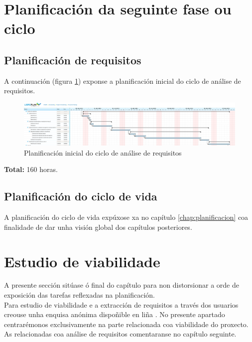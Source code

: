 \section{Planificación da seguinte fase ou ciclo}

 \subsection{Planificación de requisitos}

 A continuación (figura \ref{figura:PlanificacionInicialRequisitos}) exponse a
 planificación inicial do ciclo de análise de requisitos. \\

 \begin{figure}[htbp]
 \centering
 \includegraphics[trim=0 0 48cm 0,clip=true,scale=0.7,keepaspectratio=true]{./imagenes/requisitos.png}
 \caption{Planificación inicial do ciclo de análise de requisitos}
 \label{figura:PlanificacionInicialRequisitos}
\end{figure}

\textbf{Total:} 160 horas.

 \subsection{Planificación do ciclo de vida}

 A planificación do ciclo de vida expúxose xa no capítulo
 \ref{chap:planificacion} coa finalidade de dar unha visión global dos
 capítulos posteriores.

\section{Estudio de viabilidade}

A presente sección sitúase ó final do capítulo para non distorsionar a orde de
exposición das tarefas reflexadas na planificación.\\

Para estudio de viabilidade e a extracción de requisitos a través dos usuarios
creouse unha enquisa anónima dispoñible en liña \cite{Enquisa}. No presente
apartado centrarémonos exclusivamente na parte relacionada coa viabilidade do
proxecto. As relacionadas coa análise de requisitos comentaranse no capítulo
seguinte.\\

